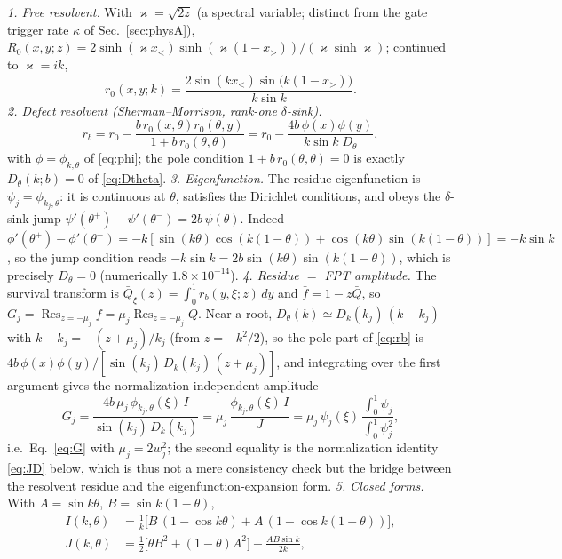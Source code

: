 \documentclass[reprint,amsmath,amssymb,aps,prresearch,longbibliography]{revtex4-2}
\begin{document}
\emph{1. Free resolvent.} With $\varkappa=\sqrt{2z}$ (a spectral variable; distinct from the gate
trigger rate $\kappa$ of Sec.~\ref{sec:physA}),
$R_0(x,y;z)=2\sinh(\varkappa x_<)\sinh(\varkappa(1-x_>))/(\varkappa\sinh \varkappa)$; continued to $\varkappa=ik$,
\begin{equation}
r_0(x,y;k)=\frac{2\sin(kx_<)\sin\!\big(k(1-x_>)\big)}{k\sin k}.
\label{eq:r0}
\end{equation}
\emph{2. Defect resolvent (Sherman--Morrison, rank-one $\delta$-sink).}
\begin{equation}
r_b=r_0-\frac{b\,r_0(x,\theta)r_0(\theta,y)}{1+b\,r_0(\theta,\theta)}
=r_0-\frac{4b\,\phi(x)\phi(y)}{k\sin k\;D_\theta},
\label{eq:rb}
\end{equation}
with $\phi=\phi_{k,\theta}$ of \eqref{eq:phi}; the pole condition $1+b\,r_0(\theta,\theta)=0$ is exactly
$D_\theta(k;b)=0$ of \eqref{eq:Dtheta}. \emph{3. Eigenfunction.} The residue eigenfunction is
$\psi_j=\phi_{k_j,\theta}$: it is continuous at $\theta$, satisfies the Dirichlet conditions, and obeys
the $\delta$-sink jump $\psi'(\theta^+)-\psi'(\theta^-)=2b\,\psi(\theta)$. Indeed
$\phi'(\theta^+)-\phi'(\theta^-)=-k[\sin(k\theta)\cos(k(1-\theta))+\cos(k\theta)\sin(k(1-\theta))]
=-k\sin k$, so the jump condition reads $-k\sin k=2b\sin(k\theta)\sin(k(1-\theta))$, which is
precisely $D_\theta=0$ (numerically $1.8\times10^{-14}$). \emph{4. Residue $=$ FPT amplitude.} The
survival transform is $\bar Q_\xi(z)=\int_0^1 r_b(y,\xi;z)\,dy$ and $\bar f=1-z\bar Q$, so
$G_j=\operatorname{Res}_{z=-\mu_j}\bar f=\mu_j\operatorname{Res}_{z=-\mu_j}\bar Q$. Near a root,
$D_\theta(k)\simeq D_k(k_j)\,(k-k_j)$ with $k-k_j=-(z+\mu_j)/k_j$ (from $z=-k^2/2$), so the pole part
of \eqref{eq:rb} is $4b\,\phi(x)\phi(y)/[\sin(k_j)\,D_k(k_j)\,(z+\mu_j)]$, and integrating over the
first argument gives the normalization-independent amplitude
\begin{equation}
G_j=\frac{4b\,\mu_j\,\phi_{k_j,\theta}(\xi)\,I}{\sin(k_j)\,D_k(k_j)}
=\mu_j\,\frac{\phi_{k_j,\theta}(\xi)\,I}{J}
=\mu_j\,\psi_j(\xi)\,\frac{\int_0^1\psi_j}{\int_0^1\psi_j^2},
\label{eq:Gderiv}
\end{equation}
i.e.\ Eq.~\eqref{eq:G} with $\mu_j=2w_j^2$; the second equality is the normalization identity
\eqref{eq:JD} below, which is thus not a mere consistency check but the bridge between the resolvent
residue and the eigenfunction-expansion form. \emph{5. Closed forms.} With $A=\sin k\theta$,
$B=\sin k(1-\theta)$,
\begin{align}
I(k,\theta)&=\tfrac1k\big[B\,(1-\cos k\theta)+A\,(1-\cos k(1-\theta))\big],\label{eq:I}\\
J(k,\theta)&=\tfrac12\big[\theta B^2+(1-\theta)A^2\big]-\frac{AB\sin k}{2k},\label{eq:J}
\end{align}
\end{document}
